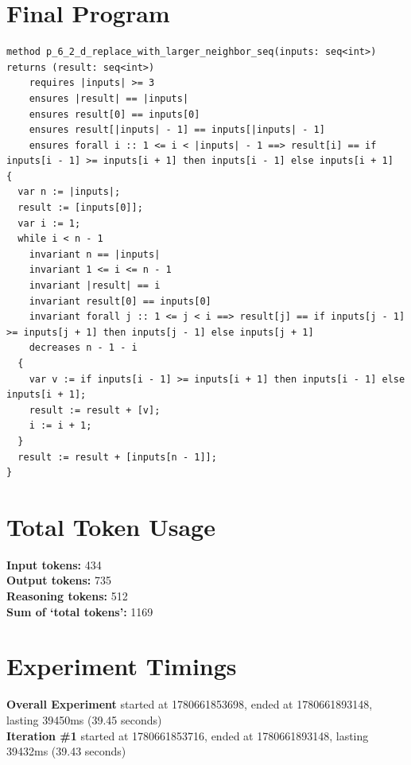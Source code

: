 \documentclass{article}
\begin{document}
\section*{Final Program}
\begin{lstlisting}
method p_6_2_d_replace_with_larger_neighbor_seq(inputs: seq<int>) returns (result: seq<int>)
	requires |inputs| >= 3
	ensures |result| == |inputs|
	ensures result[0] == inputs[0]
	ensures result[|inputs| - 1] == inputs[|inputs| - 1]
	ensures forall i :: 1 <= i < |inputs| - 1 ==> result[i] == if inputs[i - 1] >= inputs[i + 1] then inputs[i - 1] else inputs[i + 1]
{
  var n := |inputs|;
  result := [inputs[0]];
  var i := 1;
  while i < n - 1
    invariant n == |inputs|
    invariant 1 <= i <= n - 1
    invariant |result| == i
    invariant result[0] == inputs[0]
    invariant forall j :: 1 <= j < i ==> result[j] == if inputs[j - 1] >= inputs[j + 1] then inputs[j - 1] else inputs[j + 1]
    decreases n - 1 - i
  {
    var v := if inputs[i - 1] >= inputs[i + 1] then inputs[i - 1] else inputs[i + 1];
    result := result + [v];
    i := i + 1;
  }
  result := result + [inputs[n - 1]];
}
\end{lstlisting}
\section*{Total Token Usage}
\textbf{Input tokens: }434
\\\textbf{Output tokens: }735
\\\textbf{Reasoning tokens: }512
\\\textbf{Sum of `total tokens': }1169
\section*{Experiment Timings}
\textbf{Overall Experiment} started at 1780661853698, ended at 1780661893148, lasting 39450ms (39.45 seconds)
\\\textbf{Iteration \#1} started at 1780661853716, ended at 1780661893148, lasting 39432ms (39.43 seconds)
\end{document}
